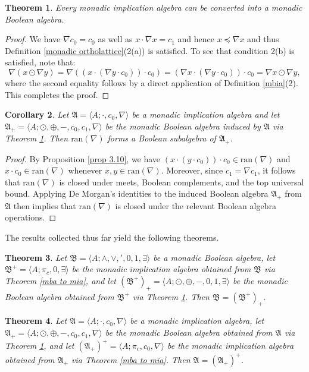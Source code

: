 \documentclass[reqno]{amsart}
\theoremstyle{plain}
\newtheorem{theorem}{Theorem}[section]
\newtheorem{corollary}[theorem]{Corollary}
\theoremstyle{definition}
\begin{document}
\begin{theorem}\label{theorem 3.13}
    Every monadic implication algebra can be converted into a monadic Boolean algebra. 
\end{theorem}
\begin{proof}
 We have $\nabla c_0=c_0$ as well as $x\cdot\nabla x=c_1$ and hence $x\preceq\nabla x$ and thus Definition \ref{monadic ortholattice}(2(a)) is satisfied. To see that condition 2(b) is satisfied, note that: \[\nabla(x\odot\nabla y)=\nabla((x\cdot(\nabla y\cdot c_0))\cdot c_0)=(\nabla x\cdot(\nabla y\cdot c_0))\cdot c_0=\nabla x\odot\nabla y,\] where the second equality follows by a direct application of Definition \ref{mbia}(2). This completes the proof.     
\end{proof}
\begin{corollary}
    Let $\mathfrak{A}=\langle A;\cdot,c_0,\nabla\rangle$ be a monadic implication algebra and let $\mathfrak{A}_+=\langle A;\odot,\oplus,-,c_0,c_1,\nabla\rangle$ be the monadic Boolean algebra induced by $\mathfrak{A}$ via Theorem \ref{theorem 3.13}. Then $\text{ran}(\nabla)$ forms a Boolean subalgebra of $\mathfrak{A}_+$. 
\end{corollary}
\begin{proof}
    By Proposition \ref{prop 3.10}, we have $(x\cdot (y\cdot c_0))\cdot c_0\in\text{ran}(\nabla)$ and $x\cdot c_0\in\text{ran}(\nabla)$ whenever $x,y\in\text{ran}(\nabla)$. Moreover, since $c_1=\nabla c_1$, it follows that $\text{ran}(\nabla)$ is closed under meets, Boolean complements, and the top universal bound. Applying De Morgan's identities to the induced Boolean algebra $\mathfrak{A}_+$ from $\mathfrak{A}$ then implies that $\text{ran}(\nabla)$ is closed under the relevant Boolean algebra operations.  
\end{proof}
The results collected thus far yield the following theorems. 
\begin{theorem}\label{theorem 3.15}
    Let $\mathfrak{B}=\langle A;\wedge,\vee,',0,1,\exists\rangle$ be a monadic Boolean algebra, let $\mathfrak{B}^+=\langle A;\pi_c,0,\exists\rangle$ be the monadic implication algebra obtained from $\mathfrak{B}$ via Theorem \ref{mba to mia}, and let $(\mathfrak{B}^{+})_+=\langle A;\odot,\oplus,-,0,1,\exists\rangle$ be the monadic Boolean algebra obtained from $\mathfrak{B}^+$ via Theorem \ref{theorem 3.13}. Then $\mathfrak{B}=(\mathfrak{B}^+)_+$. 
\end{theorem}
\begin{theorem}\label{theorem 3.16}
    Let $\mathfrak{A}=\langle A;\cdot,c_0,\nabla\rangle$ be a monadic implication algebra, let $\mathfrak{A}_+=\langle A;\odot,\oplus,-,c_0,c_1,\nabla\rangle$ be the monadic Boolean algebra obtained from $\mathfrak{A}$ via Theorem \ref{theorem 3.13}, and let $(\mathfrak{A}_+)^+=\langle A;\pi_c,c_0,\nabla\rangle$ be the monadic implication algebra obtained from $\mathfrak{A}_+$ via Theorem \ref{mba to mia}. Then $\mathfrak{A}=(\mathfrak{A}_+)^+$. 
\end{theorem}
\end{document}
